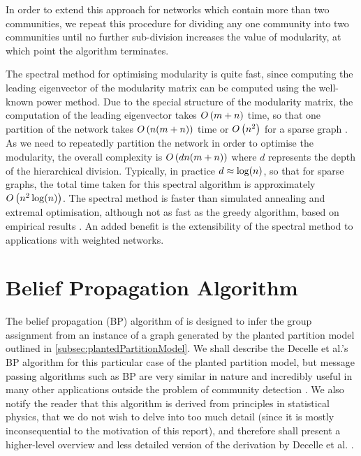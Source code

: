 In order to extend this approach for networks which contain more than two communities, we repeat this procedure for dividing any one community into two communities until no further sub-division increases the value of modularity, at which point the algorithm terminates.

The spectral method for optimising modularity is quite fast, since computing the leading eigenvector of the modularity matrix can be computed using the well-known power method.
Due to the special structure of the modularity matrix, the computation of the leading eigenvector takes $O\left(m+n\right)$ time, so that one partition of the network takes $O\left(n(m+n)\right)$ time or $O\left(n^{2}\right)$ for a sparse graph \cite{For10}.
As we need to repeatedly partition the network in order to optimise the modularity, the overall complexity is $O\left(dn(m+n)\right)$ where $d$ represents the depth of the hierarchical division.
Typically, in practice $d \approx \log(n)$, so that for sparse graphs, the total time taken for this spectral algorithm is approximately $O\left(n^{2}\log(n)\right)$.
The spectral method is faster than simulated annealing and extremal optimisation, although not as fast as the greedy algorithm, based on empirical results \cite{For10}.
An added benefit is the extensibility of the spectral method to applications with weighted networks.


\section{Belief Propagation Algorithm}
\label{sec:beliefPropagationAlgorithm}

The belief propagation (BP) algorithm of \cite{Has06,DKM+13} is designed to infer the group assignment from an instance of a graph generated by the planted partition model outlined in \cref{subsec:plantedPartitionModel}.
We shall describe the Decelle et al.'s BP algorithm \cite{DKM+13} for this particular case of the planted partition model, but message passing algorithms such as BP are very similar in nature and incredibly useful in many other applications outside the problem of community detection \cite{For10}.
We also notify the reader that this algorithm is derived from principles in statistical physics, that we do not wish to delve into too much detail (since it is mostly inconsequential to the motivation of this report), and therefore shall present a higher-level overview and less detailed version of the derivation by Decelle et al. \cite{DKM+13}. 

